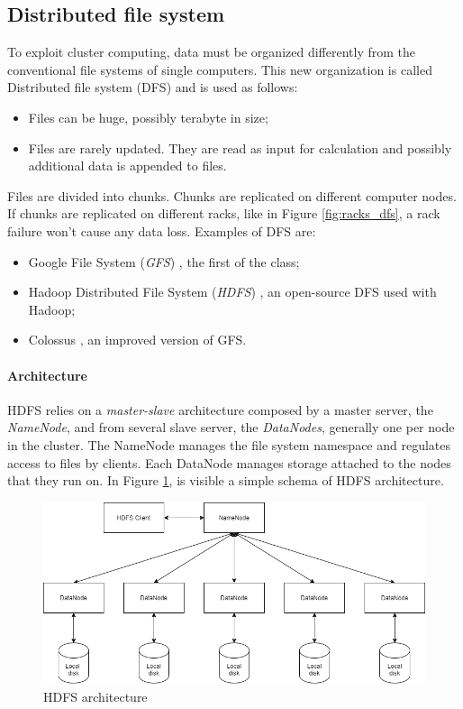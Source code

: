 \documentclass[\main/main.tex]{subfiles}
\begin{document}
\subsection{Distributed file system}
To exploit cluster computing, data must be organized differently from the conventional file systems of single computers. This new organization is called Distributed file system (DFS) and is used as follows:
\begin{itemize}
    \item Files can be huge, possibly terabyte in size;
    \item Files are rarely updated. They are read as input for calculation and possibly additional data is appended to files.
\end{itemize}
Files are divided into chunks. Chunks are replicated on different computer nodes. If chunks are replicated on different racks, like in Figure \ref{fig:racks_dfs}, a rack failure won't cause any data loss.
Examples of DFS are:
\begin{itemize}
    \item Google File System (\emph{GFS}) \cite{GhemawatSanjay2003TheGF}, the first of the class;
    \item Hadoop Distributed File System (\emph{HDFS}) \cite{Shvachko2010TheHD}, an open-source DFS used with Hadoop;
    \item Colossus \cite{10.1145/2491245}, an improved version of GFS.
\end{itemize}
\paragraph{Architecture} HDFS relies on a \emph{master-slave} architecture composed by a master server, the \emph{NameNode}, and from several slave server, the \emph{DataNodes}, generally one per node in the cluster. The NameNode manages the file system namespace and regulates access to files by clients. Each DataNode manages storage attached to the nodes that they run on. In Figure \ref{fig:hdfs_architecture}, is visible a simple schema of HDFS architecture.
\begin{figure}[H]
    \centering
    \includegraphics[scale=0.35]{images/cluster_computing/hdfs_architecture.png}
    \caption{HDFS  architecture}
    \label{fig:hdfs_architecture}
\end{figure}
\end{document}
